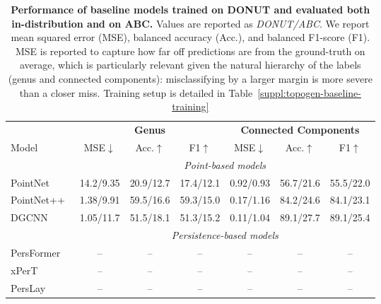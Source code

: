 \begin{table}[h]
\centering
\begin{tabular}{l|ccc|ccc}
\toprule
 & \multicolumn{3}{c|}{\textbf{Genus}} & \multicolumn{3}{c}{\textbf{Connected Components}} \\
Model & MSE$\downarrow$ & Acc.$\uparrow$ & F1$\uparrow$ & MSE$\downarrow$ & Acc.$\uparrow$ & F1$\uparrow$ \\
\midrule
\multicolumn{1}{l}{} & \multicolumn{6}{c}{\textit{Point-based models}} \\
\midrule
PointNet~\cite{pointnet}   & 14.2/9.35 & 20.9/12.7 & 17.4/12.1 & 0.92/0.93 & 56.7/21.6 & 55.5/22.0 \\
PointNet++~\cite{pointnet++} &  1.38/9.91 & 59.5/16.6 & 59.3/15.0 & 0.17/1.16 & 84.2/24.6 & 84.1/23.1 \\
DGCNN~\cite{dgcnn}      & 1.05/11.7 & 51.5/18.1 & 51.3/15.2 & 0.11/1.04 & 89.1/27.7 & 89.1/25.4 \\
\midrule
\multicolumn{1}{l}{} & \multicolumn{6}{c}{\textit{Persistence-based models}} \\
\midrule
PersFormer~\cite{persformer} & -- & -- & -- & -- & -- & -- \\
xPerT~\cite{xpert}      & -- & -- & -- & -- & -- & -- \\
PersLay~\cite{perslay}    & -- & -- & -- & -- & -- & -- \\
\bottomrule
\end{tabular}
\caption{\textbf{Performance of baseline models trained on DONUT and evaluated both in-distribution and on ABC.} Values are reported as \textit{DONUT/ABC}. We report mean squared error (MSE), balanced accuracy (Acc.), and balanced F1-score (F1). MSE is reported to capture how far off predictions are from the ground-truth on average, which is particularly relevant given the natural hierarchy of the labels (genus and connected components): misclassifying by a larger margin is more severe than a closer miss. Training setup is detailed in Table~\ref{suppl:topogen-baseline-training}}
\label{tab:topogen-results}
\end{table}